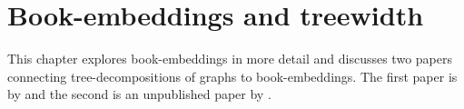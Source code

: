 \chapter{Book-embeddings and treewidth}\label{chap:book-embeddings}

This chapter explores book-embeddings in more detail and discusses two papers connecting tree-decompositions of graphs to book-embeddings. The first paper  is by \textcite{ganleyPagenumberTrees2001} and the second is an unpublished paper by \textcite{hickingbothamStackNumberCliqueSum2023}. 










%
